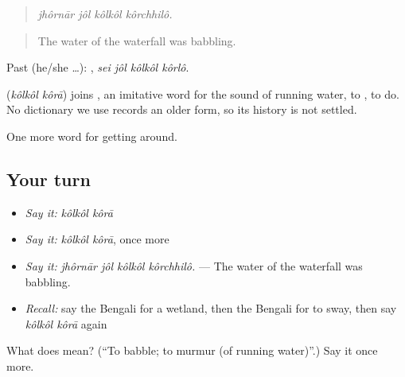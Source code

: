\begin{quote}
\emph{jhôrnār jôl kôlkôl kôrchhilô.}
\end{quote}

\begin{quote}
The water of the waterfall was babbling.
\end{quote}

Past (he/she …):    , \emph{sei jôl kôlkôl kôrlô}.

\begin{cousinweb}
\textbf{ } (\emph{kôlkôl kôrā}) joins , an imitative word for the sound of running water, to , to do. No dictionary we use records an older form, so its history is not settled.
\end{cousinweb}

\begin{grammarlens}[title={What you've built}]
One more word for getting around.
\end{grammarlens}

\subsection*{Your turn}
\begin{itemize}
\raggedright
  \item \emph{Say it:} \emph{kôlkôl kôrā}
  \item \emph{Say it:} \emph{kôlkôl kôrā}, once more
  \item \emph{Say it:} \emph{jhôrnār jôl kôlkôl kôrchhilô.} — The water of the waterfall was babbling.
  \item \emph{Recall:} say the Bengali for a wetland, then the Bengali for to sway, then say \emph{kôlkôl kôrā} again
\end{itemize}

\begin{tcolorbox}[breakable,colback=teal!4,colframe=teal!35!black,title={Before you move on}]
What does   mean? (\textquotedblleft{}To babble; to murmur (of running water)\textquotedblright{}.) Say it once more.
\end{tcolorbox}

